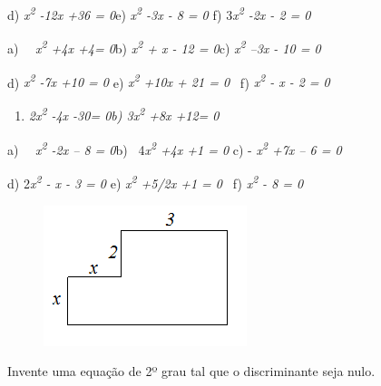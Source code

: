 \begin{exercicios}
d) \textit{x\textsuperscript{2} -12x +36 = 0\quad }e) \textit{x\textsuperscript{2} -3x -  8 = 0 \quad \quad }f) 3\textit{x\textsuperscript{2} -2x - 2 = 0}


a)~~ \textit{x\textsuperscript{2} +4x +4= 0\quad \quad }b) \textit{x\textsuperscript{2} + x - 12 = 0\quad }\quad c) \textit{x\textsuperscript{2} –3x - 10 = 0\quad }

d) \textit{x\textsuperscript{2} -7x +10 = 0 \quad }e) \textit{x\textsuperscript{2} +10x + 21 = 0~ \quad \quad }f) \textit{x\textsuperscript{2} - x - 2 = 0}


\begin{enumerate}[label=\alph*)]
	\item \textit{2x\textsuperscript{2} -4x -30= 0\quad \quad \quad b) 3x\textsuperscript{2} +8x +12= 0}
\end{enumerate}


a)~~ \textit{x\textsuperscript{2} -2x – 8 = 0\quad \quad }b)~ 4\textit{x\textsuperscript{2} +4x +1 = 0\quad } \quad c) - \textit{x\textsuperscript{2} +7x – 6 = 0}

d) 2\textit{x\textsuperscript{2} - x - 3 = 0 \quad \quad }e)  \textit{x\textsuperscript{2} +5/2x +1 = 0~ \quad \quad }f) \textit{x\textsuperscript{2} - 8 = 0}


\begin{figure}[H]
    \centering
    \includegraphics{capitulos/equacoes_de_primeiro_e_segundo_grau/media/image3.png}
\end{figure}

	\item{ Invente uma equação de 2º grau tal que o discriminante seja nulo.}


\end{exercicios}
